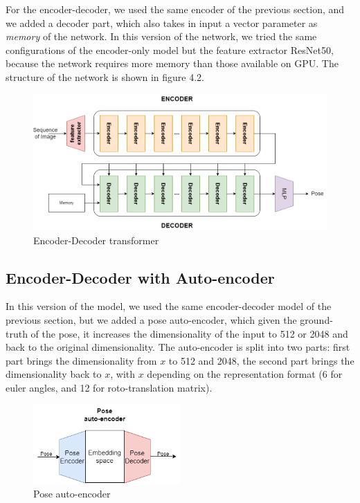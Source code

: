 For the encoder-decoder, we used the same encoder of the previous section, and we added a decoder part, which also takes in input a vector parameter as \textit{memory} of the network.
In this version of the network, we tried the same configurations of the encoder-only model but the feature extractor ResNet50, because the network requires more memory than those available on GPU.
The structure of the network is shown in figure 4.2.
\begin{figure}[H]
    \centering
    \includegraphics[width=\textwidth]{images/4_encoder_decoder}
    \caption{Encoder-Decoder transformer}\label{fig:figure-encoder-decoder-transformer}
\end{figure}

\subsection{Encoder-Decoder with Auto-encoder}\label{subsec:encoder-decoder-with-auto-encoder}
In this version of the model, we used the same encoder-decoder model of the previous section, but we added a pose auto-encoder, which given the ground-truth of the pose, it increases the dimensionality of the input to 512 or 2048 and back to the original dimensionality.
The auto-encoder is split into two parts: first part brings the dimensionality from $x$ to 512 and 2048, the second part brings the dimensionality back to $x$, with $x$ depending on the representation format (6 for euler angles, and 12 for roto-translation matrix).
\begin{figure}[H]
    \centering
    \includegraphics[width=0.5\textwidth]{images/4_pose_encoder}
    \caption{Pose auto-encoder}\label{fig:figure-pose-encoder}
\end{figure}

